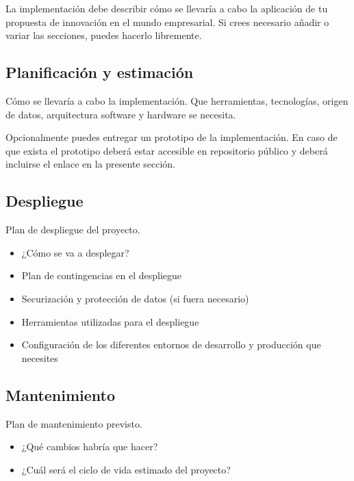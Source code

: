 \documentclass[12pt,a4paper]{proyectoinnovacion}
\begin{document}
La implementación debe describir cómo se llevaría a cabo la aplicación de tu propuesta de innovación en el mundo empresarial. Si crees necesario añadir o variar las secciones, puedes hacerlo libremente.

\subsection{Planificación y estimación}

Cómo se llevaría a cabo la implementación. Que herramientas, tecnologías, origen de datos, arquitectura software y hardware se necesita.

\begin{quotebox}
  Opcionalmente puedes entregar un prototipo de la implementación. En caso de que exista el prototipo deberá estar accesible en repositorio público y deberá incluirse el enlace en la presente sección.
\end{quotebox}

\subsection{Despliegue}

Plan de despliegue del proyecto. 

\begin{itemize}
  \item ¿Cómo se va a desplegar?
  \item Plan de contingencias en el despliegue
  \item Securización y protección de datos (si fuera necesario)
  \item Herramientas utilizadas para el despliegue
  \item Configuración de los diferentes entornos de desarrollo y producción que necesites
\end{itemize}

\subsection{Mantenimiento}

Plan de mantenimiento previsto. 

\begin{itemize}
  \item ¿Qué cambios habría que hacer?
  \item ¿Cuál será el ciclo de vida estimado del proyecto?  
\end{itemize}


\end{document}
